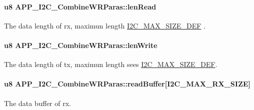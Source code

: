 \paragraph[{\texorpdfstring{len\+Read}{lenRead}}]{\setlength{\rightskip}{0pt plus 5cm}u8 A\+P\+P\+\_\+\+I2\+C\+\_\+\+Combine\+W\+R\+Paras\+::len\+Read}\hypertarget{struct_a_p_p___i2_c___combine_w_r_paras_a7e88ca41c78d7d5cbb418c54c324ca3c}{}\label{struct_a_p_p___i2_c___combine_w_r_paras_a7e88ca41c78d7d5cbb418c54c324ca3c}
The data length of rx, maximun length \hyperlink{group___i2_c___m_a_x___s_i_z_e___d_e_f}{I2\+C\+\_\+\+M\+A\+X\+\_\+\+S\+I\+Z\+E\+\_\+\+D\+EF} . 
\paragraph[{\texorpdfstring{len\+Write}{lenWrite}}]{\setlength{\rightskip}{0pt plus 5cm}u8 A\+P\+P\+\_\+\+I2\+C\+\_\+\+Combine\+W\+R\+Paras\+::len\+Write}\hypertarget{struct_a_p_p___i2_c___combine_w_r_paras_ac2f77c738ca7a2f41654d19f3acd95c3}{}\label{struct_a_p_p___i2_c___combine_w_r_paras_ac2f77c738ca7a2f41654d19f3acd95c3}
The data length of tx, maximun length sees \hyperlink{group___i2_c___m_a_x___s_i_z_e___d_e_f}{I2\+C\+\_\+\+M\+A\+X\+\_\+\+S\+I\+Z\+E\+\_\+\+D\+EF}. 
\paragraph[{\texorpdfstring{read\+Buffer}{readBuffer}}]{\setlength{\rightskip}{0pt plus 5cm}u8 A\+P\+P\+\_\+\+I2\+C\+\_\+\+Combine\+W\+R\+Paras\+::read\+Buffer\mbox{[}{\bf I2\+C\+\_\+\+M\+A\+X\+\_\+\+R\+X\+\_\+\+S\+I\+ZE}\mbox{]}}\hypertarget{struct_a_p_p___i2_c___combine_w_r_paras_a776fa5eb024d92048f721aab001a01a9}{}\label{struct_a_p_p___i2_c___combine_w_r_paras_a776fa5eb024d92048f721aab001a01a9}
The data buffer of rx. 
